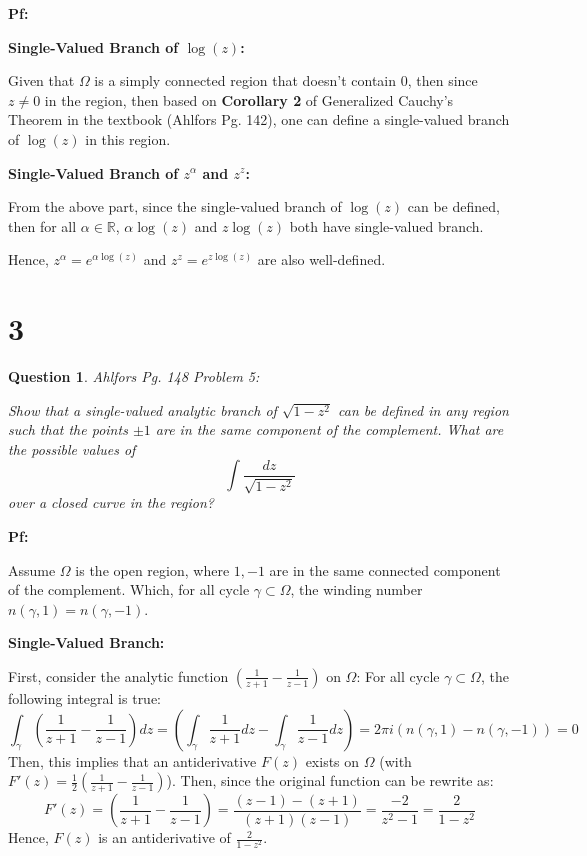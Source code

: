 \documentclass{article}
\newtheorem{question}{Question}
\begin{document}
\textbf{Pf:}

\textbf{Single-Valued Branch of $\log(z)$:}

Given that $\Omega$ is a simply connected region that doesn't contain $0$, then since $z\neq 0$ in the region,
then based on \textbf{Corollary 2} of Generalized Cauchy's Theorem in the textbook (Ahlfors Pg. 142),
one can define a single-valued branch of $\log(z)$ in this region.

\hfil

\textbf{Single-Valued Branch of $z^\alpha$ and $z^z$:}

From the above part, since the single-valued branch of $\log(z)$ can be defined, then for all $\alpha\in\mathbb{R}$, $\alpha\log(z)$ and $z\log(z)$ both have single-valued branch.

Hence, $z^\alpha = e^{\alpha \log(z)}$ and $z^z = e^{z\log (z)}$ are also well-defined.

\break

\section*{3}
\begin{myBox}[]{}
    \begin{question}
        Ahlfors Pg. 148 Problem 5:

        Show that a single-valued analytic branch of $\sqrt{1-z^2}$ can be
        defined in any region such that the points $\pm 1$ are in the same component
        of the complement. What are the possible values of
        $$\int\frac{dz}{\sqrt{1-z^2}}$$
        over a closed curve in the region?
    \end{question}
\end{myBox}

\textbf{Pf:}

Assume $\Omega$ is the open region, where $1,-1$ are in the same connected component of the complement.
Which, for all cycle $\gamma\subset \Omega$, the winding number $n(\gamma,1)=n(\gamma,-1)$.

\hfil

\textbf{Single-Valued Branch:}

First, consider the analytic function $\left(\frac{1}{z+1}-\frac{1}{z-1}\right)$ on $\Omega$: For all cycle $\gamma\subset \Omega$,
the following integral is true:
$$\int_\gamma\left(\frac{1}{z+1}-\frac{1}{z-1}\right)dz = \left(\int_\gamma\frac{1}{z+1}dz - \int_\gamma\frac{1}{z-1}dz\right) = 2\pi i(n(\gamma,1)-n(\gamma,-1)) = 0$$
Then, this implies that an antiderivative $F(z)$ exists on $\Omega$ (with $F'(z)=\frac{1}{2}\left(\frac{1}{z+1}-\frac{1}{z-1}\right)$). Then, since the original function can be rewrite as:
$$F'(z)=\left(\frac{1}{z+1}-\frac{1}{z-1}\right)=\frac{(z-1)-(z+1)}{(z+1)(z-1)}=\frac{-2}{z^2-1} = \frac{2}{1-z^2}$$
Hence, $F(z)$ is an antiderivative of $\frac{2}{1-z^2}$.
\end{document}
